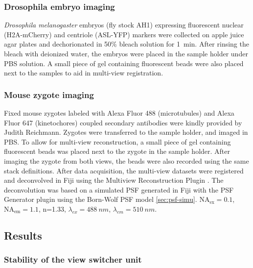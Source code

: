   \subsubsection{Drosophila embryo imaging}
    \textit{Drosophila melanogaster} embryos (fly stock AH1) expressing fluorescent nuclear (H2A-mCherry) and centriole (ASL-YFP) markers were collected on apple juice agar plates and dechorionated in 50\% bleach solution for \SI{1}{min}. After rinsing the bleach with deionized water, the embryos were placed in the sample holder under PBS solution. A small piece of gel containing fluorescent beads were also placed next to the samples to aid in multi-view registration.

  \subsubsection{Mouse zygote imaging}
    Fixed mouse zygotes labeled with Alexa Fluor 488 (microtubules) and Alexa Fluor 647 (kinetochores) coupled secondary antibodies were kindly provided by Judith Reichmann. Zygotes were transferred to the sample holder, and imaged in PBS. To allow for multi-view reconstruction, a small piece of gel containing fluorescent beads was placed next to the zygote in the sample holder. After imaging the zygote from both views, the beads were also recorded using the same stack definitions. After data acquisition, the multi-view datasets were registered and deconvolved in Fiji \cite{schindelin_fiji:_2012} using the Multiview Reconstruction Plugin \cite{preibisch_software_2010,preibisch_efficient_2014}. The deconvolution was based on a simulated PSF generated in Fiji with the PSF Generator plugin \cite{kirshner_3d_2011} using the Born-Wolf PSF model \autoref{sec:psf-simu}. $\mathrm{NA_{ex}}=0.1$, $\mathrm{NA_{em}}=1.1$, n=1.33, $\lambda_{ex} = \SI{488}{nm}$, $\lambda_{em} = \SI{510}{nm}$.

\subsection{Results}

  \subsubsection{Stability of the view switcher unit}
    \label{sec:mirrorStability}

